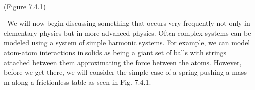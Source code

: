 \
\ 
\newline
{}
\begin{center}
(Figure 7.4.1)
\end{center}
\
We will now begin discussing something that occurs very frequently not only in elementary physics but in more advanced physics. Often complex systems can be modeled using a system of simple harmonic systems. For example, we can model atom-atom interactions in solids as being a giant set of balls with strings attached between them approximating the force between the atoms. However, before we get there, we will consider the simple case of a spring pushing a mass m along a frictionless table as seen in Fig. 7.4.1. 


